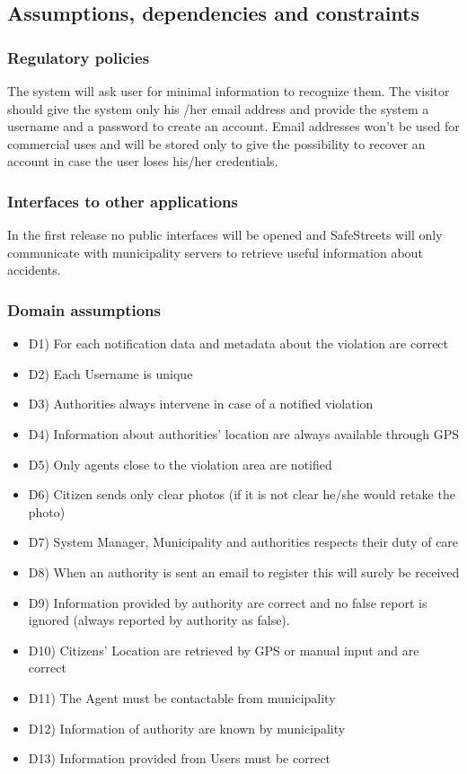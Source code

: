\subsection{Assumptions, dependencies and constraints}
\subsubsection {Regulatory policies}
The system will ask user for minimal information to recognize them. The visitor should give the system only his /her email address and provide the system a username and a password to create an account. Email addresses won’t be used for commercial uses and will be stored only to give the possibility to recover an account in case the user loses his/her credentials.
\subsubsection{ Interfaces to other applications}
In the first release no public interfaces will be opened and SafeStreets will only communicate with municipality servers to retrieve useful information about accidents.
\subsubsection{ Domain assumptions}
\begin{itemize}
\item D1) For each notification data and metadata about the violation are correct
\item D2) Each Username is unique
\item D3) Authorities always intervene in case of a notified violation
\item D4) Information about authorities’ location are always available through GPS 
\item D5) Only agents close to the violation area are notified 
\item D6) Citizen sends only clear photos (if it is not clear he/she would retake the photo)
\item D7) System Manager, Municipality and authorities respects their duty of care
\item D8) When an authority is sent an email to register this will surely be received
\item D9) Information provided by authority are correct and no false report is ignored (always reported by authority as false).
\item D10) Citizens’ Location are retrieved by GPS or manual input and are correct
\item D11) The Agent must be contactable from municipality  
\item D12) Information of authority are known by municipality
\item D13) Information provided from Users must be correct
\end{itemize}
